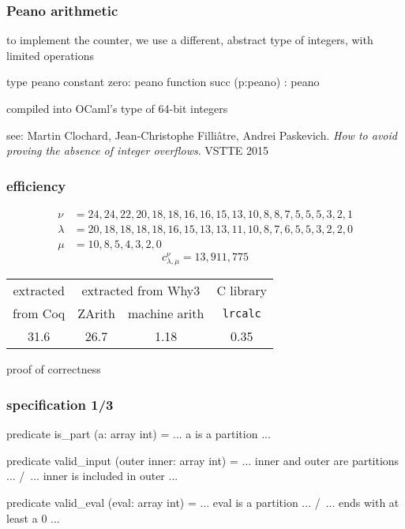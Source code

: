 \documentclass{beamer}
\let\emph\alert
\begin{document}
\begin{frame}[fragile]\frametitle{Peano arithmetic}
  to implement the counter, we use a different, abstract type of
  integers, with limited operations
\begin{why3}
  type peano
  constant zero: peano
  function succ (p:peano) : peano
\end{why3}
  compiled into OCaml's type of 64-bit integers

\vfill
  see:
  Martin Clochard, Jean-Christophe Filli\^atre, Andrei Paskevich.
  \textit{How to avoid proving the absence of integer overflows}.
  VSTTE 2015
\end{frame}

\begin{frame}\frametitle{efficiency}
  \begin{displaymath}
    \begin{array}{ll}
      \nu & = 24,24,22,20,18,18,16,16,15,13,10,8,8,7,5,5,5,3,2,1 \\
      \lambda & = 20,18,18,18,18,16,15,13,13,11,10,8,7,6,5,5,3,2,2,0 \\
      \mu & = 10,8,5,4,3,2,0
    \end{array}
  \end{displaymath}
  \begin{displaymath}
    c_{\lambda, \mu}^{\nu} = 13,911,775
  \end{displaymath}
  \bigskip
  \begin{center}
    \begin{tabular}{|c|c|c|c|}
      \hline
      extracted & \multicolumn{2}{|c|}{extracted from Why3} & C library \\
      \cline{2-3}
      from Coq  &   ZArith  & machine arith & \texttt{lrcalc} \\
      \hline\hline
      31.6      &    26.7   & 1.18 & 0.35 \\
      \hline
    \end{tabular}
  \end{center}
\end{frame}

\begin{frame}
  \begin{center}
    \emph{proof of correctness} \\
    \hrulefill
  \end{center}
\end{frame}

\begin{frame}[fragile]\frametitle{specification 1/3}
\begin{why3}
predicate is_part (a: array int) =
  ... a is a partition ...
\end{why3}
\begin{why3}
predicate valid_input (outer inner: array int) =
  ... inner and outer are partitions ... /\
  ... inner is included in outer ...
\end{why3}
\begin{why3}
predicate valid_eval (eval: array int) =
  ... eval is a partition ... /\
  ... ends with at least a 0 ...
\end{why3}
\end{frame}
\end{document}
